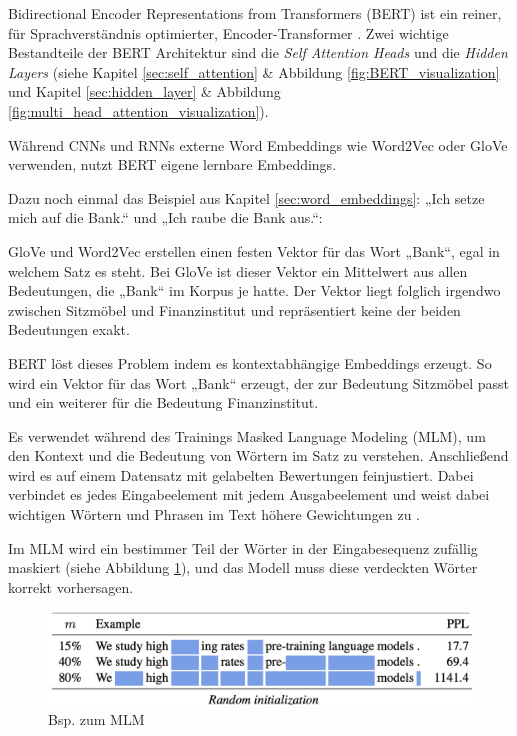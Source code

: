 Bidirectional Encoder Representations from Transformers (BERT) ist ein reiner, für Sprachverständnis optimierter, Encoder-Transformer \cite{devlin2019}.
Zwei wichtige Bestandteile der BERT Architektur sind die \textit{Self Attention Heads} und die \textit{Hidden Layers}
(siehe Kapitel \ref{sec:self_attention} \& Abbildung \ref{fig:BERT_visualization} und Kapitel \ref{sec:hidden_layer} \& Abbildung \ref{fig:multi_head_attention_visualization}).

Während CNNs und RNNs externe Word Embeddings wie Word2Vec oder GloVe verwenden, nutzt BERT eigene lernbare Embeddings.

Dazu noch einmal das Beispiel aus Kapitel \ref{sec:word_embeddings}: „Ich setze mich auf die Bank.“ und „Ich raube die Bank aus.“:

GloVe und Word2Vec erstellen einen festen Vektor für das Wort „Bank“, egal in welchem Satz es steht.
Bei GloVe ist dieser Vektor ein Mittelwert aus allen Bedeutungen, die „Bank“ im Korpus je hatte.
Der Vektor liegt folglich irgendwo zwischen Sitzmöbel und Finanzinstitut und repräsentiert keine der beiden Bedeutungen exakt.

BERT löst dieses Problem indem es kontextabhängige Embeddings erzeugt. So wird ein Vektor für das Wort „Bank“ erzeugt, der zur Bedeutung
Sitzmöbel passt und ein weiterer für die Bedeutung Finanzinstitut.

Es verwendet während des Trainings Masked Language Modeling (MLM), um den Kontext und die Bedeutung von Wörtern im Satz zu verstehen.
Anschließend wird es auf einem Datensatz mit gelabelten Bewertungen feinjustiert. 
Dabei verbindet es jedes Eingabeelement mit jedem Ausgabeelement und 
weist dabei wichtigen Wörtern und Phrasen im Text höhere Gewichtungen zu \cite{Deshai:2023aa}.

Im MLM wird ein bestimmer Teil der Wörter in der Eingabesequenz zufällig maskiert (siehe Abbildung \ref{fig:mlm_bert}), 
und das Modell muss diese verdeckten Wörter korrekt vorhersagen.

\begin{figure}[htbp]
    \begin{center}
        \includegraphics[scale=0.5]{static/mlm_bert.png}
        \caption{\label{fig:mlm_bert} Bsp. zum MLM \cite{wettig2023}}
    \end{center}
\end{figure}


